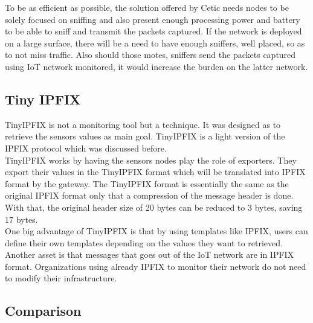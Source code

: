 To be as efficient as possible, the solution offered by Cetic needs nodes to be solely focused on sniffing and also present enough processing power and battery to be able to sniff and transmit the packets captured. If the network is deployed on a large surface, there will be a need to have enough sniffers, well placed, so as to not miss traffic. Also should those motes, sniffers send the packets captured using IoT network monitored, it would increase the burden on the latter network. \\

\subsection{Tiny IPFIX}

TinyIPFIX \cite{schmitt2016tinyipfix} is not a monitoring tool but a technique. It was designed as to retrieve the sensors values as main goal. TinyIPFIX is a light version of the IPFIX protocol which was discussed before.\\

TinyIPFIX works by having the sensors nodes play the role of exporters. They export their values in the TinyIPFIX format which will be translated into IPFIX format by the gateway. The TinyIPFIX format is essentially the same as the original IPFIX format only that a compression of the message header is done. With that, the original header size of 20 bytes can be reduced to 3 bytes, saving 17 bytes.\\

One big advantage of TinyIPFIX is that by using templates like IPFIX, users can define their own templates depending on the values they want to retrieved. Another asset is that messages that goes out of the IoT network are in IPFIX format. Organizations using already IPFIX to monitor their network do not need to modify their infrastructure.


\subsection{Comparison}
